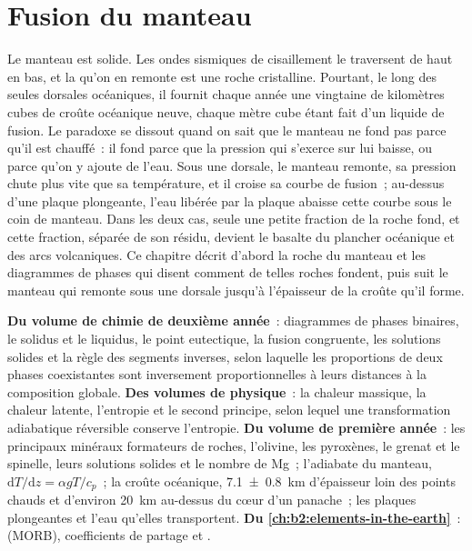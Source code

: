 \chapter{Fusion du manteau}\label{ch:b2:mantle-melting}

Le manteau est solide. Les ondes sismiques de cisaillement le traversent de haut
en bas, et la  qu'on en remonte est une roche cristalline. Pourtant, le
long des seules dorsales océaniques, il fournit chaque année une vingtaine de
kilomètres cubes de croûte océanique neuve, chaque mètre cube étant fait d'un
liquide de fusion. Le paradoxe se dissout quand on sait que le manteau ne fond pas
parce qu'il est chauffé~: il fond parce que la pression qui s'exerce sur lui baisse,
ou parce qu'on y ajoute de l'eau. Sous une dorsale, le manteau remonte, sa pression
chute plus vite que sa température, et il croise sa courbe de fusion~; au-dessus d'une
plaque plongeante, l'eau libérée par la plaque abaisse cette courbe sous le coin de
manteau. Dans les deux cas, seule une petite fraction de la roche fond, et cette fraction,
séparée de son résidu, devient le basalte du plancher océanique et des arcs volcaniques. Ce
chapitre décrit d'abord la roche du manteau et les diagrammes de phases qui disent comment
de telles roches fondent, puis suit le manteau qui remonte sous une dorsale jusqu'à l'épaisseur de la croûte qu'il forme.

\begin{recall}
\textbf{Du volume de chimie de deuxième année}~: diagrammes de phases binaires, le
solidus et le liquidus, le point eutectique, la fusion congruente, les solutions
solides et la règle des segments inverses, selon laquelle les proportions de deux phases
coexistantes sont inversement proportionnelles à leurs distances à la composition globale.
\textbf{Des volumes de physique}~: la chaleur massique, la chaleur latente, l'entropie
et le second principe, selon lequel une transformation adiabatique réversible conserve l'entropie.
\textbf{Du volume de première année}~: les principaux minéraux formateurs de roches, l'olivine,
les pyroxènes, le grenat et le spinelle, leurs solutions solides et le nombre de Mg~; l'adiabate
du manteau, $\mathrm dT/\mathrm dz = \alpha gT/c_p$~; la croûte océanique,
\qty[uncertainty-mode=separate]{7.1 \pm 0.8}{km} d'épaisseur loin des points chauds et
d'environ \qty{20}{km} au-dessus du cœur d'un panache~; les plaques plongeantes et l'eau qu'elles
transportent. \textbf{Du \cref{ch:b2:elements-in-the-earth}}~: 
(MORB), coefficients de partage et .
\end{recall}


